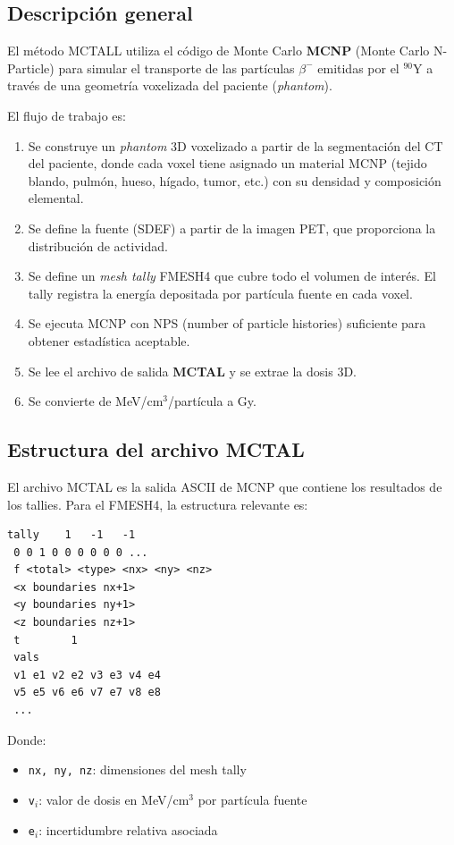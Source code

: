 \documentclass[12pt,a4paper]{article}
\begin{document}
\subsection{Descripción general}

El método MCTALL utiliza el código de Monte Carlo \textbf{MCNP} (Monte Carlo
N-Particle) para simular el transporte de las partículas $\beta^-$ emitidas
por el $^{90}$Y a través de una geometría voxelizada del paciente
(\emph{phantom}).

El flujo de trabajo es:

\begin{enumerate}
    \item Se construye un \emph{phantom} 3D voxelizado a partir de la
        segmentación del CT del paciente, donde cada voxel tiene asignado
        un material MCNP (tejido blando, pulmón, hueso, hígado, tumor, etc.)
        con su densidad y composición elemental.
    \item Se define la fuente (SDEF) a partir de la imagen PET, que
        proporciona la distribución de actividad.
    \item Se define un \emph{mesh tally} FMESH4 que cubre todo el volumen
        de interés. El tally registra la energía depositada por partícula
        fuente en cada voxel.
    \item Se ejecuta MCNP con NPS (number of particle histories) suficiente
        para obtener estadística aceptable.
    \item Se lee el archivo de salida \textbf{MCTAL} y se extrae la dosis
        3D.
    \item Se convierte de MeV/cm$^3$/partícula a Gy.
\end{enumerate}

\subsection{Estructura del archivo MCTAL}

El archivo MCTAL es la salida ASCII de MCNP que contiene los resultados de
los tallies. Para el FMESH4, la estructura relevante es:

\begin{lstlisting}
tally    1   -1   -1
 0 0 1 0 0 0 0 0 0 ...
 f <total> <type> <nx> <ny> <nz>
 <x boundaries nx+1>
 <y boundaries ny+1>
 <z boundaries nz+1>
 t        1
 vals
 v1 e1 v2 e2 v3 e3 v4 e4
 v5 e5 v6 e6 v7 e7 v8 e8
 ...
\end{lstlisting}

Donde:
\begin{itemize}
    \item \texttt{nx, ny, nz}: dimensiones del mesh tally
    \item \texttt{v$_i$}: valor de dosis en MeV/cm$^3$ por partícula fuente
    \item \texttt{e$_i$}: incertidumbre relativa asociada
\end{itemize}
\end{document}
